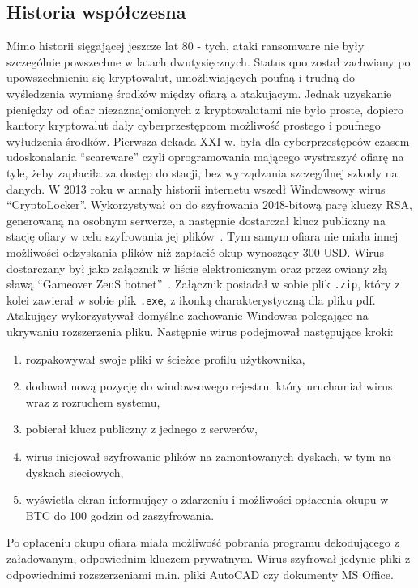 \subsection{Historia współczesna}
Mimo historii sięgającej jeszcze lat 80 - tych, ataki ransomware nie były szczególnie powszechne w latach dwutysięcznych. Status quo został zachwiany po upowszechnieniu się kryptowalut, umożliwiających poufną i trudną do wyśledzenia wymianę środków między ofiarą a atakującym. Jednak uzyskanie pieniędzy od ofiar niezaznajomionych z kryptowalutami nie było proste, dopiero kantory kryptowalut dały cyberprzestępcom możliwość prostego i poufnego wyłudzenia środków. Pierwsza dekada XXI w. była dla cyberprzestępców czasem udoskonalania \foreignquote{english}{scareware} czyli oprogramowania mającego wystraszyć ofiarę na tyle, żeby zapłaciła za dostęp do stacji, bez wyrządzania szczególnej szkody na danych. 
\newline
W 2013 roku w annały historii internetu wszedł Windowsowy wirus \foreignquote{english}{CryptoLocker}. Wykorzystywał on do szyfrowania 2048-bitową parę kluczy RSA, generowaną na osobnym serwerze, a następnie dostarczał klucz publiczny na stację ofiary w celu szyfrowania jej plików~\cite{cryptolockerfaq}. Tym samym ofiara nie miała innej możliwości odzyskania plików niż zapłacić okup wynoszący 300 USD. Wirus dostarczany był jako załącznik w liście elektronicznym oraz przez owiany złą sławą \foreignquote{english}{Gameover ZeuS botnet}~\cite{zeusbot}. Załącznik posiadał w sobie plik \texttt{.zip}, który z kolei zawierał w sobie plik \texttt{.exe}, z ikonką charakterystyczną dla pliku pdf. Atakujący wykorzystywał domyślne zachowanie Windowsa polegające na ukrywaniu rozszerzenia pliku. Następnie wirus podejmował następujące kroki:
\begin{enumerate}
    \item rozpakowywał swoje pliki w ścieżce profilu użytkownika,
    \item dodawał nową pozycję do windowsowego rejestru, który uruchamiał wirus wraz z rozruchem systemu,
    \item pobierał klucz publiczny z jednego z serwerów,
    \item wirus inicjował szyfrowanie plików na zamontowanych dyskach, w tym na dyskach sieciowych,
    \item wyświetla ekran informujący o zdarzeniu i możliwości opłacenia okupu w BTC do 100 godzin od zaszyfrowania.
\end{enumerate}
Po opłaceniu okupu ofiara miała możliwość pobrania programu dekodującego z załadowanym, odpowiednim kluczem prywatnym. Wirus szyfrował jedynie pliki z odpowiednimi rozszerzeniami m.in. pliki AutoCAD czy dokumenty MS Office.

